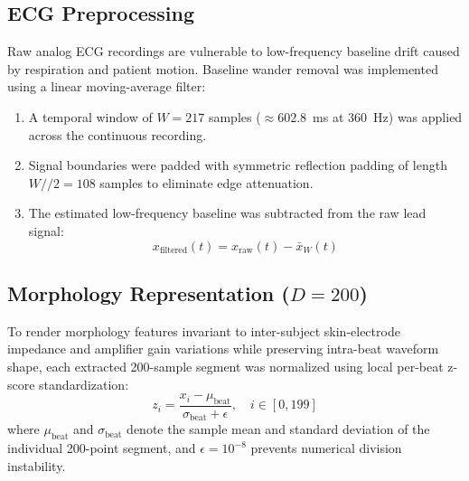 \documentclass[conference]{IEEEtran}
\begin{document}
\subsection{ECG Preprocessing}
Raw analog ECG recordings are vulnerable to low-frequency baseline drift caused by respiration and patient motion. Baseline wander removal was implemented using a linear moving-average filter:
\begin{enumerate}
    \item A temporal window of $W = 217$ samples ($\approx 602.8$~ms at 360~Hz) was applied across the continuous recording.
    \item Signal boundaries were padded with symmetric reflection padding of length $W // 2 = 108$ samples to eliminate edge attenuation.
    \item The estimated low-frequency baseline was subtracted from the raw lead signal:
    \begin{equation}
        x_{\text{filtered}}(t) = x_{\text{raw}}(t) - \bar{x}_W(t)
    \end{equation}
\end{enumerate}

\subsection{Morphology Representation ($D = 200$)}
To render morphology features invariant to inter-subject skin-electrode impedance and amplifier gain variations while preserving intra-beat waveform shape, each extracted 200-sample segment was normalized using local per-beat z-score standardization:
\begin{equation}
    z_i = \frac{x_i - \mu_{\text{beat}}}{\sigma_{\text{beat}} + \epsilon}, \quad i \in [0, 199]
\end{equation}
where $\mu_{\text{beat}}$ and $\sigma_{\text{beat}}$ denote the sample mean and standard deviation of the individual 200-point segment, and $\epsilon = 10^{-8}$ prevents numerical division instability.
\end{document}
